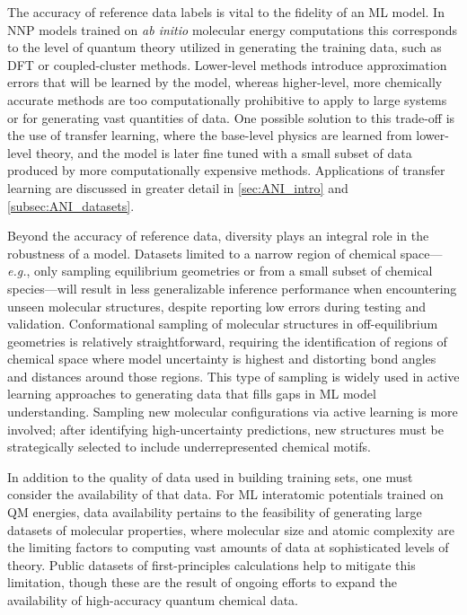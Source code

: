 The accuracy of reference data labels is vital to the fidelity of an ML model. 
In NNP models trained on \textit{ab initio} molecular energy computations this corresponds to the level of quantum theory utilized in generating the training data, such as DFT \cite{dft_first_paper} or coupled-cluster \cite{coupled_cluster_first_paper} methods.
Lower-level methods introduce approximation errors that will be learned by the model, whereas higher-level, more chemically accurate methods are too computationally prohibitive to apply to large systems or for generating vast quantities of data.
One possible solution to this trade-off is the use of transfer learning, where the base-level physics are learned from lower-level theory, and the model is later fine tuned with a small subset of data produced by more computationally expensive methods.
Applications of transfer learning are discussed in greater detail in \ref{sec:ANI_intro} and \ref{subsec:ANI_datasets}.

Beyond the accuracy of reference data, diversity plays an integral role in the robustness of a model.
Datasets limited to a narrow region of chemical space---\textit{e.g.}, only sampling equilibrium geometries or from a small subset of chemical species---will result in less generalizable inference performance when encountering unseen molecular structures, despite reporting low errors during testing and validation.
Conformational sampling of molecular structures in off-equilibrium geometries is relatively straightforward, requiring the identification of regions of chemical space where model uncertainty is highest and distorting bond angles and distances around those regions.
This type of sampling is widely used in active learning approaches to generating data that fills gaps in ML model understanding.
Sampling new molecular configurations via active learning is more involved; after identifying high-uncertainty predictions, new structures must be strategically selected to include underrepresented chemical motifs.

In addition to the quality of data used in building training sets, one must consider the availability of that data.
For ML interatomic potentials trained on QM energies, data availability pertains to the feasibility of generating large datasets of molecular properties, where molecular size and atomic complexity are the limiting factors to computing vast amounts of data at sophisticated levels of theory.
Public datasets of first-principles calculations \cite{qm9, qm40} help to mitigate this limitation, though these are the result of ongoing efforts to expand the availability of high-accuracy quantum chemical data.

